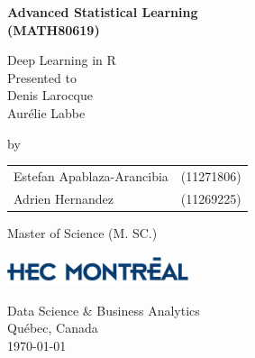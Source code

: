 \documentclass[letter,8pt]{article}\usepackage[]{graphicx}\usepackage[]{color}
\begin{document}
\pagestyle{plain}
\begin{titlepage}
   \begin{center}
       \vspace*{1cm}
 
       \textbf{Advanced Statistical Learning\\ (MATH80619)}
 
       \vspace{0.5cm}
        Deep Learning in R \\
        \vspace{2.5cm}
        Presented to\\
        Denis Larocque \\ Aurélie Labbe
        
       \vspace{5.5cm}
        by\\
        \vspace{0.5cm}


\begin{tabular}{ll}
    Estefan Apablaza-Arancibia & (11271806) \\
    Adrien Hernandez  & (11269225)\\ 
\end{tabular}
 
       \vfill
 
       Master of Science (M. SC.)
 
       \vspace{0.8cm}
 
       \includegraphics[width=0.4\textwidth]{figure/hec_logo.jpg}
 
       Data Science \& Business Analytics\\
       Québec, Canada\\
       \today{}
 
   \end{center}
\end{titlepage}
\newpage
\pagestyle{plain}


\newpage
\pagestyle{fancy}
\end{document}
